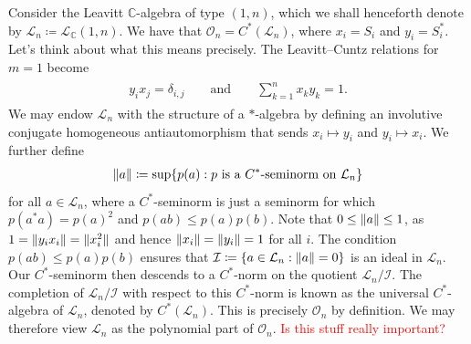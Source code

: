 \noindent Consider the Leavitt $\mathbb{C}$-algebra of type $(1, n)$, which we shall henceforth denote by $\mathcal{L}_n \coloneqq \mathcal{L}_\mathbb{C}(1, n)$. We have that $\mathcal{O}_n = C^*(\mathcal{L}_n)$, where $x_i = S_i$ and $y_i = S_i^*$. Let's think about what this means precisely. The Leavitt--Cuntz relations for $m = 1$ become
\begin{align*}
\begin{split}
y_i x_j = \delta_{i,j}\qquad\text{and}\qquad\sum_{k=1}^n x_k y_k = 1.
\end{split}
\end{align*}
\noindent We may endow $\mathcal{L}_n$ with the structure of a $*$-algebra by defining an involutive conjugate homogeneous antiautomorphism that sends $x_i \mapsto y_i$ and $y_i \mapsto x_i$. We further define
\begin{align*}
\begin{split}
\lVert a\rVert \coloneqq \sup\{p(a) : \textup{$p$ is a $C^*$-seminorm on $\mathcal{L}_n$}\}
\end{split}
\end{align*}
\noindent for all $a \in \mathcal{L}_n$, where a $C^*$-seminorm is just a seminorm for which $p(a^*a) = p(a)^2$ and $p(ab) \leq p(a)p(b)$. Note that $0 \leq \lVert a\rVert \leq 1$, as $1 = \lVert y_ix_i\rVert = \lVert x_i^2\rVert$ and hence $\lVert x_i\rVert = \lVert y_i\rVert = 1$ for all $i$. The condition $p(ab) \leq p(a)p(b)$ ensures that $\mathcal{I} \coloneqq \{a \in \mathcal{L}_n : \lVert a\rVert = 0\}$ is an ideal in $\mathcal{L}_n$. Our $C^*$-seminorm then descends to a $C^*$-norm on the quotient $\mathcal{L}_n/\mathcal{I}$. The completion of $\mathcal{L}_n/\mathcal{I}$ with respect to this $C^*$-norm is known as the universal $C^*$-algebra of $\mathcal{L}_n$, denoted by $C^*(\mathcal{L}_n)$. This is precisely $\mathcal{O}_n$ by definition. We may therefore view $\mathcal{L}_n$ as the polynomial part of $\mathcal{O}_n$. \textcolor{red}{Is this stuff really important?}\\

